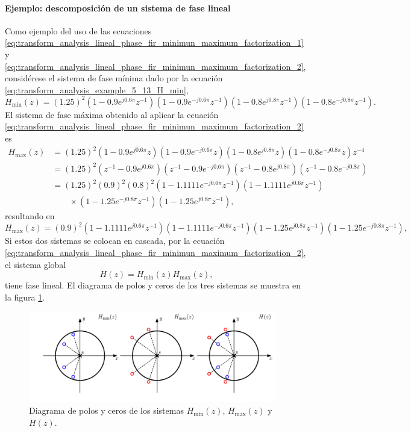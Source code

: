 \documentclass[a4paper]{report}
\begin{document}
\paragraph{Ejemplo: descomposición de un sistema de fase lineal} Como ejemplo del uso de las ecuaciones \ref{eq:transform_analysis_lineal_phase_fir_minimun_maximum_factorization_1} y \ref{eq:transform_analysis_lineal_phase_fir_minimun_maximum_factorization_2}, considérese el sistema de fase mínima dado por la ecuación \ref{eq:transform_analysis_example_5_13_H_min},
\[
 H_\textrm{min}(z)=(1.25)^2(1-0.9e^{j0.6\pi}z^{-1})(1-0.9e^{-j0.6\pi}z^{-1})(1-0.8e^{j0.8\pi}z^{-1})(1-0.8e^{-j0.8\pi}z^{-1}).
\]
El sistema de fase máxima obtenido al aplicar la ecuación \ref{eq:transform_analysis_lineal_phase_fir_minimun_maximum_factorization_2} es
\begin{align*}
  H_\textrm{max}(z)&=(1.25)^2(1-0.9e^{j0.6\pi}z)(1-0.9e^{-j0.6\pi}z)(1-0.8e^{j0.8\pi}z)(1-0.8e^{-j0.8\pi}z)z^{-4}\\
   &=(1.25)^2(z^{-1}-0.9e^{j0.6\pi})(z^{-1}-0.9e^{-j0.6\pi})(z^{-1}-0.8e^{j0.8\pi})(z^{-1}-0.8e^{-j0.8\pi})\\
   &=(1.25)^2(0.9)^2(0.8)^2(1-1.1111e^{-j0.6\pi}z^{-1})(1-1.1111e^{j0.6\pi}z^{-1})\\
   &\qquad\times(1-1.25e^{-j0.8\pi}z^{-1})(1-1.25e^{j0.8\pi}z^{-1}),
\end{align*}
resultando en
\[
 H_\textrm{max}(z)=(0.9)^2(1-1.1111e^{j0.6\pi}z^{-1})(1-1.1111e^{-j0.6\pi}z^{-1})(1-1.25e^{j0.8\pi}z^{-1})(1-1.25e^{-j0.8\pi}z^{-1}),
\]
Si estos dos sistemas se colocan en cascada, por la ecuación \ref{eq:transform_analysis_lineal_phase_fir_minimun_maximum_factorization_2}, el sistema global
\[
 H(z)=H_\textrm{min}(z)H_\textrm{max}(z),
\]
tiene fase lineal. El diagrama de polos y ceros de los tres sistemas se muestra en la figura \ref{fig:example_05_19_zero_pole_plot}.
\begin{figure}[!htb]
 \begin{center}
 \includegraphics[width=0.97\textwidth]{figuras/example_05_19_zero_pole_plot.pdf}
 \caption{\label{fig:example_05_19_zero_pole_plot} Diagrama de polos y ceros de los sistemas \(H_\textrm{min}(z)\), \(H_\textrm{max}(z)\) y \(H(z)\).}
 \end{center}
\end{figure}
\end{document}
